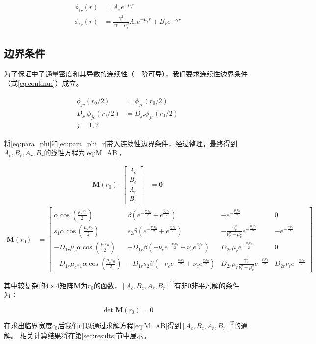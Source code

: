 \begin{align}
    \label{eq:para_phi_r}
    \begin{split}
        \phi_{1r}(r) &= A_r e^{-\mu_r r} \\
        \phi_{2r}(r) &= \frac{\gamma_r^2}{\nu_r^2 - \mu_r^2}A_r e^{-\mu_r r} + B_r e^{-\nu_r r}
    \end{split}
\end{align}

\subsection{边界条件}

为了保证中子通量密度和其导数的连续性（一阶可导），我们要求连续性边界条件（式\ref{eq:continue}）成立。

\begin{align}
    \label{eq:continue}
    \begin{split}
        \phi_{jc}(r_0 / 2) &= \phi_{jr}(r_0 / 2) \\
        D_{jc}\phi_{jc}(r_0 / 2) &= D_{jr}\phi_{jr}(r_0 / 2) \\
        j = 1,2
    \end{split}
\end{align}

将\ref{eq:para_phi}和\ref{eq:para_phi_r}带入连续性边界条件，经过整理，最终得到$A_c,B_c,A_r,B_r$的线性方程为\ref{eq:M_AB}，

\begin{align}
    \label{eq:M_AB}
    \pmb{M}(r_0) \cdot \begin{bmatrix}
        A_c \\
        B_c \\
        A_r \\
        B_r
    \end{bmatrix} &= \pmb{0}
\end{align}
\begin{align}
    \pmb{M}(r_0) &= 
    \begin{bmatrix}
        \alpha\cos(\frac{\mu_c r_0}{2}) & \beta(e^{-\frac{\nu_c r_0}{2}}+e^{\frac{\nu_c r_0}{2}}) & -e^{-\frac{\mu_r r_0}{2}} & 0 \\
        s_1\alpha\cos(\frac{\mu_c r_0}{2}) & s_2\beta(e^{-\frac{\nu_c r_0}{2}}+e^{\frac{\nu_c r_0}{2}}) & -\frac{\gamma_r^2}{\nu_r^2 - \mu_r^2}e^{-\frac{\mu_r r_0}{2}} & -e^{-\frac{\nu_r r_0}{2}} \\
        -D_{1r}\mu_c\alpha\cos(\frac{\mu_c r_0}{2}) & -D_{1r}\beta(-\nu_c e^{-\frac{\nu_c r_0}{2}}+\nu_c e^{\frac{\nu_c r_0}{2}}) & D_{2r}\mu_r e^{-\frac{\mu_r r_0}{2}} & 0 \\
        -D_{1r}\mu_c s_1\alpha\cos(\frac{\mu_c r_0}{2}) & -D_{1r}s_2\beta(-\nu_c e^{-\frac{\nu_c r_0}{2}}+\nu_c e^{\frac{\nu_c r_0}{2}}) & D_{2r}\mu_r\frac{\gamma_r^2}{\nu_r^2 - \mu_r^2}e^{-\frac{\mu_r r_0}{2}} & D_{2r}\nu_r e^{-\frac{\nu_r r_0}{2}}
    \end{bmatrix}
\end{align}

其中较复杂的$4\times4$矩阵$\pmb{M}$为$r_0$的函数，$\left[A_c,B_c,A_r,B_r\right]^{\mathrm{T}}$有非$0$非平凡解的条件为：

\begin{equation}
    \det \pmb{M}(r_0) = 0
\end{equation}

在求出临界宽度$r_0$后我们可以通过求解方程\ref{eq:M_AB}得到$\left[A_c,B_c,A_r,B_r\right]^{\mathrm{T}}$的通解。
相关计算结果将在第\ref{sec:results}节中展示。
